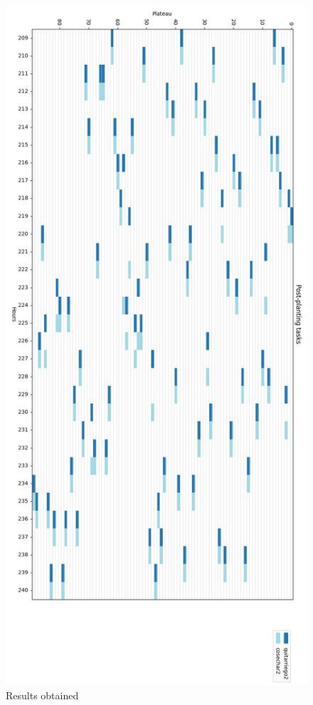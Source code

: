 \begin{figure}[ht!]
    \centering
    \includegraphics[scale=0.4]{img/grafico_post_siembra2.png}
    \caption{Results obtained}
    \label{fig:resultados_post2}
\end{figure}



